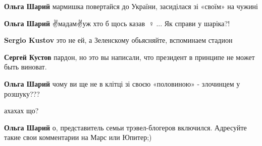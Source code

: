 \begin{itemize}
\begin{itemize}
\textbf{Ольга Шарий} мармишка повертайся до України, засиділася зі «своїм» на чужині

 
\textbf{Ольга Шарий} ✌️мадам✌️уж хто б щось казав🤦🏼♀️🤦...
Як справи у шаріка?!

 
\textbf{Sergio Kustov} это не ей, а Зеленскому обьясняйте, вспоминаем стадион

 
\textbf{Сергей Кустов} пардон, но это вы написали, что президент в принципе не может быть виноват.

 
\textbf{Ольга Шарий} чому ви ще не в клітці зі своєю «половиною» - злочинцем у розшуку???

 
ахахах що?

 
\textbf{Ольга Шарий} о, представитель семьи трэвел-блогеров включился. Адресуйте такие свои комментарии на Марс или Юпитер;)


\end{itemize}
\end{itemize}
